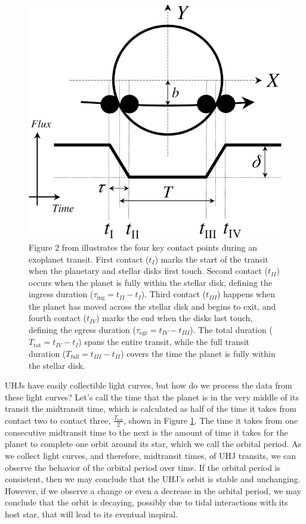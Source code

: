 \documentclass[oneside,12pt]{amsart}
\numberwithin{page}{section}
\begin{document}
\begin{figure}[htbp]
    \centering
    \includegraphics[width=0.6\linewidth]{figs/winn_fig2.png}
    \caption{Figure 2 from \citet{winn2010transits} illustrates the four key contact points during an exoplanet transit. First contact ($t_I$) marks the start of the transit when the planetary and stellar disks first touch. Second contact ($t_{II}$) occurs when the planet is fully within the stellar disk, defining the ingress duration ($\tau_\text{ing} = t_{II} - t_I$). Third contact ($t_{III}$) happens when the planet has moved across the stellar disk and begins to exit, and fourth contact ($t_{IV}$) marks the end when the disks last touch, defining the egress duration ($\tau_\text{egr} = t_{IV} - t_{III}$). The total duration ($T_\text{tot} = t_{IV} - t_{I}$) spans the entire transit, while the full transit duration ($T_\text{full} = t_{III} - t_{II}$) covers the time the planet is fully within the stellar disk.}
    \label{fig:winnfig2}
\end{figure}

UHJs have easily collectible light curves, but how do we process the data from these light curves? Let's call the time that the planet is in the very middle of its transit the midtransit time, which is calculated as half of the time it takes from contact two to contact three, $\frac{T_{\text{tot}}}{2}$, shown in Figure \ref{fig:winnfig2}. The time it takes from one consecutive midtransit time to the next is the amount of time it takes for the planet to complete one orbit around its star, which we call the orbital period. As we collect light curves, and therefore, midtransit times, of UHJ transits, we can observe the behavior of the orbital period over time. If the orbital period is consistent, then we may conclude that the UHJ's orbit is stable and unchanging. However, if we observe a change or even a decrease in the orbital period, we may conclude that the orbit is decaying, possibly due to tidal interactions with its host star, that will lead to its eventual inspiral. 
\end{document}
